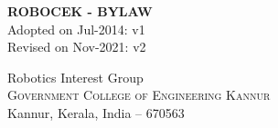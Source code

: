 \begin{titlepage}
	\clearpage
	\NoBgThispage
	\vspace*{\fill}
	\thispagestyle{empty}
	\begin{onehalfspace}
		\begin{center}
			
			\textup{\huge{\bf ROBOCEK - BYLAW}}
			\\[0.3in]

			Adopted on Jul-2014: v1\\
			Revised on Nov-2021: v2

			
			\vfill
			
			\begin{center}
			\end{center}
			
			\Large{Robotics Interest Group}\\
			\normalsize \textsc{Government College of Engineering Kannur}\\ Kannur, Kerala, India -- 670563 \\
			\vspace{0.2cm}
			
		\end{center}
	\end{onehalfspace}
	\vspace*{\fill}
\end{titlepage}
